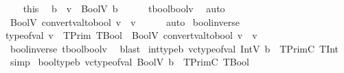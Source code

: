 \begin{isabellebody}
\ \ \isamarkupfalse%
\ this\ \isamarkupfalse%
\ b\ \ {\isachardoublequoteopen}v\ {\isacharequal}{\kern0pt}\ BoolV\ b{\isachardoublequoteclose}\isanewline
\ \ \ \ \isamarkupfalse%
\ tbool{\isacharunderscore}{\kern0pt}boolv\ \isamarkupfalse%
\ auto\ \ \isanewline
\ \ \isamarkupfalse%
\ {\isachardoublequoteopen}BoolV\ {\isacharparenleft}{\kern0pt}convert{\isacharunderscore}{\kern0pt}val{\isacharunderscore}{\kern0pt}to{\isacharunderscore}{\kern0pt}bool\ v{\isacharparenright}{\kern0pt}\ {\isacharequal}{\kern0pt}\ v{\isachardoublequoteclose}\isanewline
\ \ \ \ \isamarkupfalse%
\ auto\isanewline
{}\isamarkupfalse%
%
\endisatagproof
{\isafoldproof}%
%
\isadelimproof
\isanewline
%
\endisadelimproof
\isanewline
{}\isamarkupfalse%
\ bool{\isacharunderscore}{\kern0pt}inverse{\isacharunderscore}{\kern0pt}{}{\isacharcolon}{\kern0pt}\isanewline
{\isachardoublequoteopen}type{\isacharunderscore}{\kern0pt}of{\isacharunderscore}{\kern0pt}val\ v\ {\isacharequal}{\kern0pt}\ TPrim\ TBool\ {\isasymLongrightarrow}\ BoolV\ {\isacharparenleft}{\kern0pt}convert{\isacharunderscore}{\kern0pt}val{\isacharunderscore}{\kern0pt}to{\isacharunderscore}{\kern0pt}bool\ v{\isacharparenright}{\kern0pt}\ {\isacharequal}{\kern0pt}\ v{\isachardoublequoteclose}\isanewline
%
\isadelimproof
\ \ %
\endisadelimproof
%
\isatagproof
{}\isamarkupfalse%
\ bool{\isacharunderscore}{\kern0pt}inverse{\isacharunderscore}{\kern0pt}{}\ tbool{\isacharunderscore}{\kern0pt}boolv\ \isamarkupfalse%
\ blast%
\endisatagproof
{\isafoldproof}%
%
\isadelimproof
\isanewline
%
\endisadelimproof
\isanewline
{}\isamarkupfalse%
\ int{\isacharunderscore}{\kern0pt}type{\isacharcolon}{\kern0pt}{\isachardoublequoteopen}{\isasymforall}b{\isachardot}{\kern0pt}\ vc{\isacharunderscore}{\kern0pt}type{\isacharunderscore}{\kern0pt}of{\isacharunderscore}{\kern0pt}val\ {\isacharparenleft}{\kern0pt}IntV\ b{\isacharparenright}{\kern0pt}\ {\isacharequal}{\kern0pt}\ TPrimC\ TInt{\isachardoublequoteclose}\isanewline
%
\isadelimproof
\ \ %
\endisadelimproof
%
\isatagproof
{}\isamarkupfalse%
\ simp%
\endisatagproof
{\isafoldproof}%
%
\isadelimproof
\isanewline
%
\endisadelimproof
\isanewline
{}\isamarkupfalse%
\ bool{\isacharunderscore}{\kern0pt}type{\isacharcolon}{\kern0pt}{\isachardoublequoteopen}{\isasymforall}b{\isachardot}{\kern0pt}\ vc{\isacharunderscore}{\kern0pt}type{\isacharunderscore}{\kern0pt}of{\isacharunderscore}{\kern0pt}val\ {\isacharparenleft}{\kern0pt}BoolV\ b{\isacharparenright}{\kern0pt}\ {\isacharequal}{\kern0pt}\ TPrimC\ TBool{\isachardoublequoteclose}\isanewline

\end{isabellebody}
